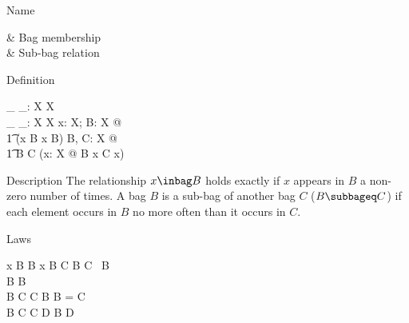 \begin{manpage}\label{p:inbag}\label{p:5015}
\item[Name]
\begin{name}
        \inbag 		& Bag membership%
		  \symdex{$\inbag$} \\
	\subbageq	& Sub-bag relation%
		  \symdex{$\subbageq$}
\end{name}

\item[Definition]
\begin{gendef}[X]
        \_ \inbag \_: X \rel \bag X \\
	\_ \subbageq \_: \bag X \rel \bag X
\where
        \forall x: X; B: \bag X @ \\
\t1         (x \inbag B \iff x \in \dom B)
\also
	\forall B, C: \bag X @ \\
\t1	    B \subbageq C \iff
		(\forall x: X @ B \bcount x \leq C \bcount x)
\end{gendef}

\item[Description]
The relationship $x \inbag B$ holds exactly if $x$ appears in $B$ a
non-zero number of times.  A bag $B$ is a sub-bag of another bag $C$
($B \subbageq C$) if each element occurs in $B$ no more often than it
occurs in $C$.

\item[Laws]
\begin{laws}
        x \inbag B \iff B \bcount x 
\also
	B \subbageq C \implies \dom B \subseteq \dom C
\also
	\lbag~\rbag \subbageq B \\
	B \subbageq B \\
	B \subbageq C \land C \subbageq B \implies B = C \\
	B \subbageq C \land C \subbageq D \implies B \subbageq D
\end{laws}
\end{manpage}
